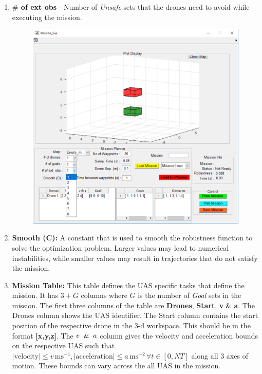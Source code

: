 \documentclass[english]{article}
\begin{document}
\begin{enumerate}
\begin{figure}[H]
    \end{figure}
    \item \textbf{$\#$ of ext obs} - Number of \textit{Unsafe} sets that the drones need to avoid while executing the mission.
    \begin{figure}[H]
        \centering
        \includegraphics[scale=0.5]{obs.pdf}
    \end{figure}
    \item \textbf{Smooth (C):} A constant that is used to smooth the robustness function to solve the optimization problem. Larger values may lead to numerical instabilities, while smaller values may result in trajectories that do not satisfy the mission.
    
    \item \textbf{Mission Table:} This table defines the UAS specific tasks that define the mission. It has $3+G$ columns where $G$ is the number of \textit{Goal} sets in the mission. The first three columns of the table are \textbf{Drones}, \textbf{Start}, \textbf{v$\And$a}. The Drones column shows the UAS identifier. The Start column contains the start position of the respective drone in the 3-d workspace. This should be in the format \textbf{[x,y,z]}. The  $v\And a$ column gives the velocity and acceleration bounds on the respective UAS such that $|\text{velocity}| \leq v\, \text{ms}^{-1}, |\text{acceleration}| \leq a\, \text{ms}^{-2} \, \forall t \in [0,NT]$ along all 3 axes of motion. These bounds can vary across the all UAS in the mission.
    

\end{enumerate}
\end{document}
